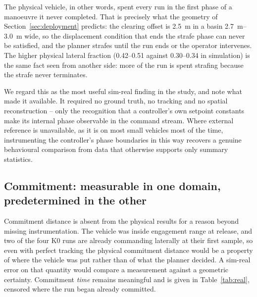 The physical vehicle, in other words, spent every run in the first phase
of a manoeuvre it never completed. That is precisely what the geometry
of Section~\ref{sec:deployment} predicts: the clearing offset is
\SI{2.5}{\metre} in a basin \SIrange{2.7}{3.0}{\metre} wide, so the
displacement condition that ends the strafe phase can never be satisfied,
and the planner strafes until the run ends or the operator intervenes.
The higher physical lateral fraction (\numrange{0.42}{0.51} against
\numrange{0.30}{0.34} in simulation) is the same fact seen from another
side: more of the run is spent strafing because the strafe never
terminates.

We regard this as the most useful sim-real finding in the study, and note
what made it available. It required no ground truth, no tracking and no
spatial reconstruction -- only the recognition that a controller's own
setpoint constants make its internal phase observable in the command
stream. Where external reference is unavailable, as it is on most small
vehicles most of the time, instrumenting the controller's phase
boundaries in this way recovers a genuine behavioural comparison from
data that otherwise supports only summary statistics.

\subsection{Commitment: measurable in one domain, predetermined in the
other}

Commitment distance is absent from the physical results for a reason
beyond missing instrumentation. The vehicle was inside engagement range
at release, and two of the four \textsf{K0} runs are already commanding
laterally at their first sample, so even with perfect tracking the
physical commitment distance would be a property of where the vehicle was
put rather than of what the planner decided. A sim-real error on that
quantity would compare a measurement against a geometric certainty.
Commitment \emph{time} remains meaningful and is given in
Table~\ref{tab:real}, censored where the run began already committed.

